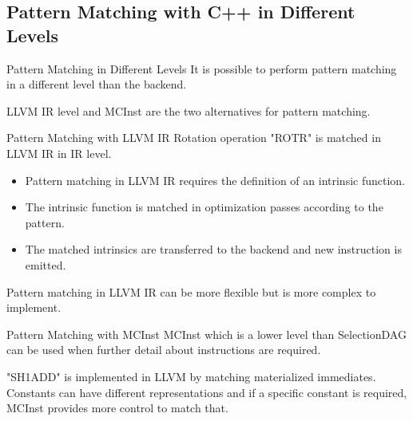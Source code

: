 \subsection{Pattern Matching with C++ in Different Levels}


\begin{frame}{Pattern Matching in Different Levels}
It is possible to perform pattern matching in a different level than the backend. 

LLVM IR level and MCInst are the two alternatives for pattern matching.
\begin{center}
\end{center}
\end{frame}

\begin{frame}{Pattern Matching with LLVM IR}
Rotation operation "ROTR" is matched in LLVM IR in IR level.
    \begin{itemize}
        \item Pattern matching in LLVM IR requires the definition of an intrinsic function.
        \item The intrinsic function is matched in optimization passes according to the pattern.
        \item The matched intrinsics are transferred to the backend and new instruction is emitted.
    \end{itemize}
    Pattern matching in LLVM IR can be more flexible but is more complex to implement.
\end{frame}

\begin{frame}{Pattern Matching with MCInst}
MCInst which is a lower level than SelectionDAG can be used when further detail about instructions are required.

"SH1ADD" is implemented in LLVM by matching materialized immediates. Constants can have different representations and if a specific constant is required, MCInst provides more control to match that. 
\end{frame}


